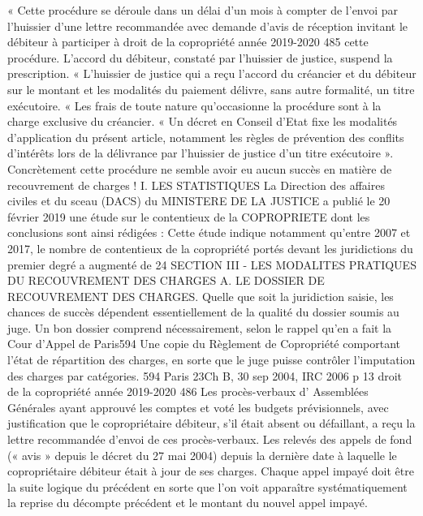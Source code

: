 « Cette procédure se déroule dans un délai d’un mois à compter de l’envoi par l’huissier d’une lettre recommandée avec demande d’avis de réception invitant le débiteur à participer à
droit de la copropriété année 2019-2020
485
cette procédure. L’accord du débiteur, constaté par l’huissier de justice, suspend la prescription.
« L’huissier de justice qui a reçu l’accord du créancier et du débiteur sur le montant et les modalités du paiement délivre, sans autre formalité, un titre exécutoire.
« Les frais de toute nature qu’occasionne la procédure sont à la charge exclusive du créancier.
« Un décret en Conseil d’Etat fixe les modalités d’application du présent article, notamment les règles de prévention des conflits d’intérêts lors de la délivrance par l’huissier de justice d’un titre exécutoire ».
Concrètement cette procédure ne semble avoir eu aucun succès en matière de recouvrement de charges !
I. LES STATISTIQUES La Direction des affaires civiles et du sceau (DACS) du MINISTERE DE LA JUSTICE a publié le 20 février 2019 une étude sur le contentieux de la COPROPRIETE dont les conclusions sont ainsi rédigées : Cette étude indique notamment qu’entre 2007 et 2017, le nombre de contentieux de la copropriété portés devant les juridictions du premier degré a augmenté de 24%
SECTION III - LES MODALITES PRATIQUES DU RECOUVREMENT DES CHARGES
A. LE DOSSIER DE RECOUVREMENT DES CHARGES.
Quelle que soit la juridiction saisie, les chances de succès dépendent essentiellement de la qualité du dossier soumis au juge.
Un bon dossier comprend nécessairement, selon le rappel qu’en a fait la Cour d’Appel de Paris594
Une copie du Règlement de Copropriété comportant l'état de répartition des charges, en sorte que le juge puisse contrôler l'imputation des charges par catégories.
594 Paris 23\degres Ch B, 30 sep 2004, IRC 2006  p 13
droit de la copropriété année 2019-2020
486
Les procès-verbaux d' Assemblées Générales ayant approuvé les comptes et voté les budgets prévisionnels, avec justification que le copropriétaire débiteur, s'il était absent ou défaillant, a reçu la lettre recommandée d'envoi de ces procès-verbaux.
Les relevés des appels de fond (« avis » depuis le décret du 27 mai 2004) depuis la dernière date à laquelle le copropriétaire débiteur était à jour de ses charges. Chaque appel impayé doit être la suite logique du précédent en sorte que l'on voit apparaître systématiquement la reprise du décompte précédent et le montant du nouvel appel impayé.
